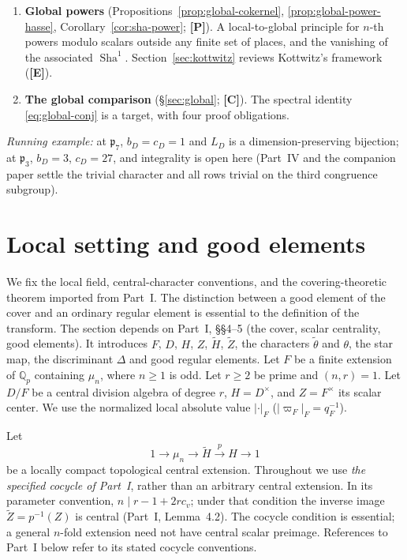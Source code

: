 \documentclass[11pt]{article}
\newcommand{\tH}{\widetilde H}
\newcommand{\tZ}{\widetilde Z}
\newcommand{\Sha}{\operatorname{Sha}}
\newcommand{\Ptag}{\textnormal{\textbf{[P]}}}
\newcommand{\Etag}{\textnormal{\textbf{[E]}}}
\newcommand{\Ctag}{\textnormal{\textbf{[C]}}}
\theoremstyle{plain}
\theoremstyle{definition}
\begin{document}
\begin{enumerate}[leftmargin=*,label=\arabic*.]
\item \textbf{Global powers} (Propositions~\ref{prop:global-cokernel}, \ref{prop:global-power-hasse}, Corollary~\ref{cor:sha-power}; \Ptag). A local-to-global principle for $n$-th powers modulo scalars outside any finite set of places, and the vanishing of the associated $\Sha^1$. Section~\ref{sec:kottwitz} reviews Kottwitz's framework (\Etag).
\item \textbf{The global comparison} (\S\ref{sec:global}; \Ctag). The spectral identity \eqref{eq:global-conj} is a target, with four proof obligations.
\end{enumerate}
\emph{Running example:} at $\mathfrak p_7$, $b_D=c_D=1$ and $L_D$ is a dimension-preserving bijection; at $\mathfrak p_3$, $b_D=3$, $c_D=27$, and integrality is open here (Part~IV and the companion paper settle the trivial character and all rows trivial on the third congruence subgroup).

\section{Local setting and good elements}
We fix the local field, central-character conventions, and the
covering-theoretic theorem imported from Part~I. The distinction
between a good element of the cover and an ordinary regular element
is essential to the definition of the transform. The section depends on Part~I, \S\S4--5 (the cover, scalar centrality, good elements). It introduces $F$, $D$, $H$, $Z$, $\tH$, $\tZ$, the characters $\tilde\theta$ and $\theta$, the star map, the discriminant $\Delta$ and good regular elements.
Let $F$ be a finite extension of $\mathbb Q_p$ containing $\mu_n$, where $n\ge1$ is odd. Let $r\ge2$ be prime and $(n,r)=1$. Let $D/F$ be a central division algebra of degree $r$, $H=D^\times$, and $Z=F^\times$ its scalar center. We use the normalized local absolute value $|\cdot|_F$ ($|\varpi_F|_F=q_F^{-1}$).

Let
\begin{equation}\label{eq:extension}
1\longrightarrow\mu_n\longrightarrow\tH\overset{p}{\longrightarrow}H\longrightarrow1
\end{equation}
be a locally compact topological central extension. Throughout we use \emph{the specified cocycle of Part~I}, rather than an arbitrary central extension. In its parameter convention, $n\mid r-1+2rc_v$; under that condition the inverse image $\tZ=p^{-1}(Z)$ is central (Part~I, Lemma~4.2). The cocycle condition is essential; a general $n$-fold extension need not have central scalar preimage. References to Part~I below refer to its stated cocycle conventions.
\end{document}
